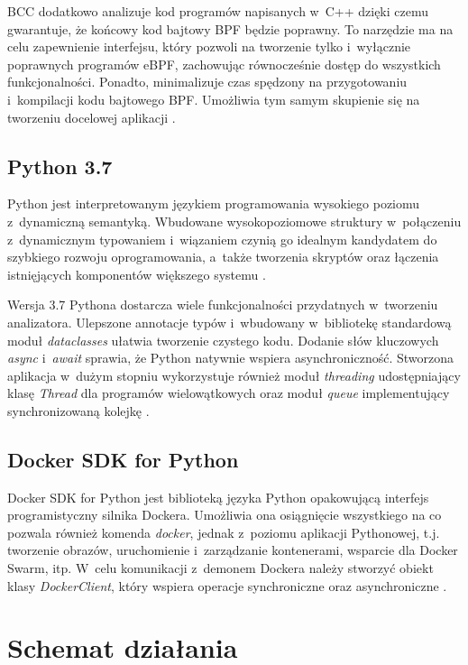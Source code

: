 BCC dodatkowo analizuje kod programów napisanych w~C++ dzięki czemu gwarantuje, że końcowy kod bajtowy BPF będzie poprawny. To narzędzie ma na celu zapewnienie interfejsu, który pozwoli na tworzenie tylko i~wyłącznie poprawnych programów eBPF, zachowując równocześnie dostęp do wszystkich funkcjonalności. Ponadto, minimalizuje czas spędzony na przygotowaniu i~kompilacji kodu bajtowego BPF. Umożliwia tym samym skupienie się na tworzeniu docelowej aplikacji \cite{BCCReadme}.

\subsection{Python 3.7}

Python jest interpretowanym językiem programowania wysokiego poziomu z~dynamiczną semantyką. Wbudowane wysokopoziomowe struktury w~połączeniu z~dynamicznym typowaniem i~wiązaniem czynią go idealnym kandydatem do szybkiego rozwoju oprogramowania, a~także tworzenia skryptów oraz łączenia istnięjących komponentów większego systemu \cite{PythonExecutiveSummary}.

Wersja 3.7 Pythona dostarcza wiele funkcjonalności przydatnych w~tworzeniu analizatora. Ulepszone annotacje typów i~wbudowany w~bibliotekę standardową moduł \textit{dataclasses} ułatwia tworzenie czystego kodu. Dodanie słów kluczowych \textit{async} i~\textit{await} sprawia, że Python natywnie wspiera asynchroniczność. Stworzona aplikacja w~dużym stopniu wykorzystuje również moduł \textit{threading} udostępniający klasę \textit{Thread} dla programów wielowątkowych oraz moduł \textit{queue} implementujący synchronizowaną kolejkę \cite{Python3.7}.

\subsection{Docker SDK for Python}

Docker SDK for Python jest biblioteką języka Python opakowującą interfejs programistyczny silnika Dockera. Umożliwia ona osiągnięcie wszystkiego na co pozwala również komenda \textit{docker}, jednak z~poziomu aplikacji Pythonowej, t.j. tworzenie obrazów, uruchomienie i~zarządzanie kontenerami, wsparcie dla Docker Swarm, itp. W~celu komunikacji z~demonem Dockera należy stworzyć obiekt klasy \textit{DockerClient}, który wspiera operacje synchroniczne oraz asynchroniczne \cite{PythonDockerSDK}.

\section{Schemat działania}

